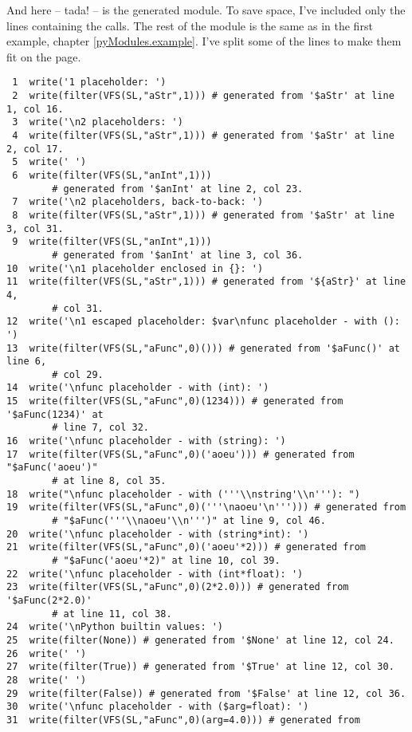 And here -- tada! -- is the generated module.
To save space, I've included only the lines containing the  calls.
The rest of the module is the same as in the first example, chapter
\ref{pyModules.example}.  I've split some of the lines to make them fit on
the page.

\begin{verbatim}
 1  write('1 placeholder: ')
 2  write(filter(VFS(SL,"aStr",1))) # generated from '$aStr' at line 1, col 16.
 3  write('\n2 placeholders: ')
 4  write(filter(VFS(SL,"aStr",1))) # generated from '$aStr' at line 2, col 17.
 5  write(' ')
 6  write(filter(VFS(SL,"anInt",1))) 
        # generated from '$anInt' at line 2, col 23.
 7  write('\n2 placeholders, back-to-back: ')
 8  write(filter(VFS(SL,"aStr",1))) # generated from '$aStr' at line 3, col 31.
 9  write(filter(VFS(SL,"anInt",1))) 
        # generated from '$anInt' at line 3, col 36.
10  write('\n1 placeholder enclosed in {}: ')
11  write(filter(VFS(SL,"aStr",1))) # generated from '${aStr}' at line 4, 
        # col 31.
12  write('\n1 escaped placeholder: $var\nfunc placeholder - with (): ')
13  write(filter(VFS(SL,"aFunc",0)())) # generated from '$aFunc()' at line 6, 
        # col 29.
14  write('\nfunc placeholder - with (int): ')
15  write(filter(VFS(SL,"aFunc",0)(1234))) # generated from '$aFunc(1234)' at 
        # line 7, col 32.
16  write('\nfunc placeholder - with (string): ')
17  write(filter(VFS(SL,"aFunc",0)('aoeu'))) # generated from "$aFunc('aoeu')"
        # at line 8, col 35.
18  write("\nfunc placeholder - with ('''\\nstring'\\n'''): ")
19  write(filter(VFS(SL,"aFunc",0)('''\naoeu'\n'''))) # generated from 
        # "$aFunc('''\\naoeu'\\n''')" at line 9, col 46.
20  write('\nfunc placeholder - with (string*int): ')
21  write(filter(VFS(SL,"aFunc",0)('aoeu'*2))) # generated from 
        # "$aFunc('aoeu'*2)" at line 10, col 39.
22  write('\nfunc placeholder - with (int*float): ')
23  write(filter(VFS(SL,"aFunc",0)(2*2.0))) # generated from '$aFunc(2*2.0)' 
        # at line 11, col 38.
24  write('\nPython builtin values: ')
25  write(filter(None)) # generated from '$None' at line 12, col 24.
26  write(' ')
27  write(filter(True)) # generated from '$True' at line 12, col 30.
28  write(' ')
29  write(filter(False)) # generated from '$False' at line 12, col 36.
30  write('\nfunc placeholder - with ($arg=float): ')
31  write(filter(VFS(SL,"aFunc",0)(arg=4.0))) # generated from 

\end{verbatim}
